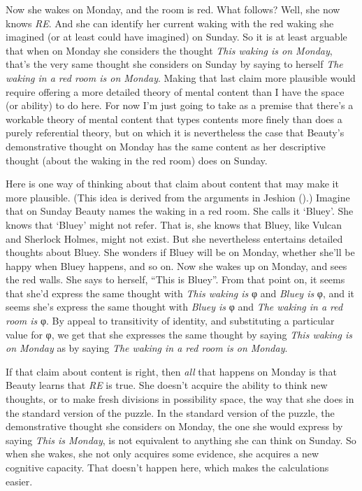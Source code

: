 \documentclass[
  11pt,
  letterpaper,
  DIV=11,
  numbers=noendperiod,
  twoside]{scrartcl}
\begin{document}
Now she wakes on Monday, and the room is red. What follows? Well, she
now knows \emph{RE}. And she can identify her current waking with the
red waking she imagined (or at least could have imagined) on Sunday. So
it is at least arguable that when on Monday she considers the thought
\emph{This waking is on Monday}, that's the very same thought she
considers on Sunday by saying to herself \emph{The waking in a red room
is on Monday}. Making that last claim more plausible would require
offering a more detailed theory of mental content than I have the space
(or ability) to do here. For now I'm just going to take as a premise
that there's a workable theory of mental content that types contents
more finely than does a purely referential theory, but on which it is
nevertheless the case that Beauty's demonstrative thought on Monday has
the same content as her descriptive thought (about the waking in the red
room) does on Sunday.

Here is one way of thinking about that claim about content that may make
it more plausible. (This idea is derived from the arguments in Jeshion
().) Imagine that on Sunday Beauty names
the waking in a red room. She calls it `Bluey'. She knows that `Bluey'
might not refer. That is, she knows that Bluey, like Vulcan and Sherlock
Holmes, might not exist. But she nevertheless entertains detailed
thoughts about Bluey. She wonders if Bluey will be on Monday, whether
she'll be happy when Bluey happens, and so on. Now she wakes up on
Monday, and sees the red walls. She says to herself, ``This is Bluey''.
From that point on, it seems that she'd express the same thought with
\emph{This waking is} φ and \emph{Bluey is} φ, and it seems she's
express the same thought with \emph{Bluey is} φ and \emph{The waking in
a red room is} φ. By appeal to transitivity of identity, and
substituting a particular value for φ, we get that she expresses the
same thought by saying \emph{This waking is on Monday} as by saying
\emph{The waking in a red room is on Monday}.

If that claim about content is right, then \emph{all} that happens on
Monday is that Beauty learns that \emph{RE} is true. She doesn't acquire
the ability to think new thoughts, or to make fresh divisions in
possibility space, the way that she does in the standard version of the
puzzle. In the standard version of the puzzle, the demonstrative thought
she considers on Monday, the one she would express by saying \emph{This
is Monday}, is not equivalent to anything she can think on Sunday. So
when she wakes, she not only acquires some evidence, she acquires a new
cognitive capacity. That doesn't happen here, which makes the
calculations easier.
\end{document}
